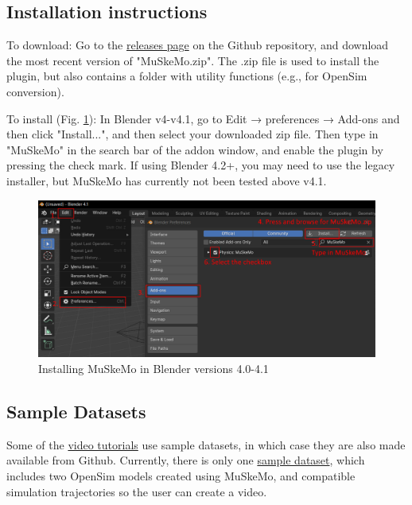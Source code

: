 \documentclass{article}
\begin{document}
\subsection{Installation instructions}

To download: Go to the \href{https://github.com/PashavanBijlert/MuSkeMo/releases}{releases page} on the Github repository, and download the most recent version of "MuSkeMo.zip". The .zip file is used to install the plugin, but also contains a folder with utility functions (e.g., for OpenSim conversion).

To install (Fig. \ref{fig:installation}): In Blender v4-v4.1, go to Edit → preferences → Add-ons and then click "Install...", and then select your downloaded zip file. Then type in "MuSkeMo" in the search bar of the addon window, and enable the plugin by pressing the check mark. If using Blender 4.2+, you may need to use the legacy installer, but MuSkeMo has currently not been tested above v4.1.

\begin{figure}[h]
    \centering
    \includegraphics[width=\textwidth]{figures/install_instructions.png} %
    \caption{Installing MuSkeMo in Blender versions 4.0-4.1}
    \label{fig:installation}
\end{figure}

\subsection{Sample Datasets}
\label{sec:sampledataset}
Some of the \href{https://youtube.com/playlist?list=PLfgxaucAWlEp5-cavvXmdrTIWYT_tgZYK&si=Cdl9MchuLP5aRJNL}{video tutorials} use sample datasets, in which case they are also made available from Github. Currently, there is only one \href{https://github.com/PashavanBijlert/MuSkeMo/releases/tag/v0.x-sampledataset1}{sample dataset}, which includes two OpenSim models created using MuSkeMo, and compatible simulation trajectories so the user can create a video.
\end{document}
